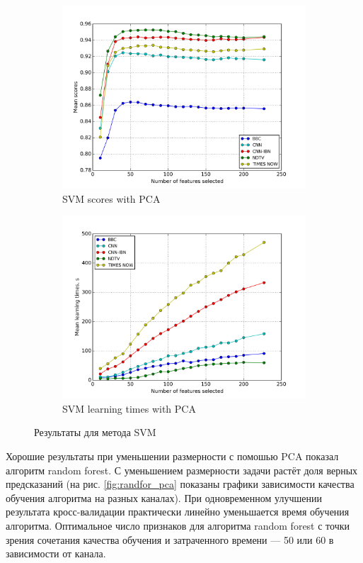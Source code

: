 \begin{figure}[h!]
    \centering
	\begin{subfigure}{0.45\textwidth}
		\includegraphics[width=\textwidth]{images/PCA-SVM.png}
		\caption{SVM scores with PCA}
	\end{subfigure}
	\begin{subfigure}{0.45\textwidth}
		\includegraphics[width=\textwidth]{images/PCA-SVMTime.png}
		\caption{SVM learning times with PCA}
	\end{subfigure}
	\caption{Результаты для метода SVM}\label{fig:svm_pca}
\end{figure}

\par
 Хорошие результаты при уменьшении размерности с помошью PCA показал алгоритм random forest. С уменьшением размерности задачи растёт доля верных предсказаний (на рис. \ref{fig:randfor_pca} показаны графики 
 зависимости качества обучения алгоритма на разных каналах).
 При одновременном улучшении результата кросс-валидации практически линейно уменьшается время обучения алгоритма. Оптимальное число признаков для алгоритма random forest с точки зрения сочетания качества обучения и затраченного времени --- 50 или 60 в зависимости от канала.
 
